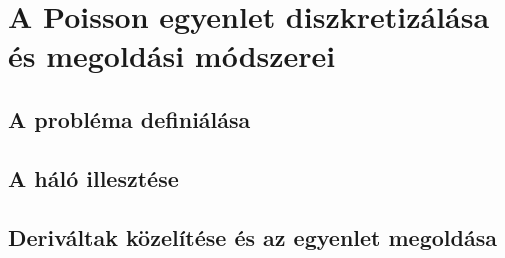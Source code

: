 \chapter{A Poisson egyenlet diszkretizálása és megoldási módszerei}

\section{A probléma definiálása}


\section{A háló illesztése}


\section{Deriváltak közelítése és az egyenlet megoldása}


